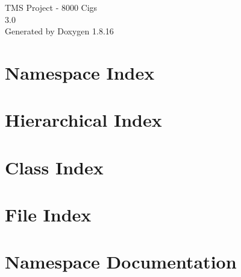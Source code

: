 \let\mypdfximage\pdfximage\def\pdfximage{\immediate\mypdfximage}\documentclass[twoside]{book}
\newcommand{\+}{\discretionary{\mbox{\scriptsize$\hookleftarrow$}}{}{}}
\newcommand{\clearemptydoublepage}{%
  \newpage{\pagestyle{empty}\cleardoublepage}%
}
\begin{document}
\hypersetup{pageanchor=false,
             bookmarksnumbered=true,
             pdfencoding=unicode
            }
\begin{titlepage}
\vspace*{7cm}
\begin{center}%
{\Large T\+MS Project -\/ 8000 Cigs \\[1ex]\large 3.\+0 }\\
\vspace*{1cm}
{\large Generated by Doxygen 1.8.16}\\
\end{center}
\end{titlepage}
\clearemptydoublepage
{}
\tableofcontents
\clearemptydoublepage
{}
\hypersetup{pageanchor=true}

\chapter{Namespace Index}

\chapter{Hierarchical Index}

\chapter{Class Index}

\chapter{File Index}

\chapter{Namespace Documentation}



\end{document}
